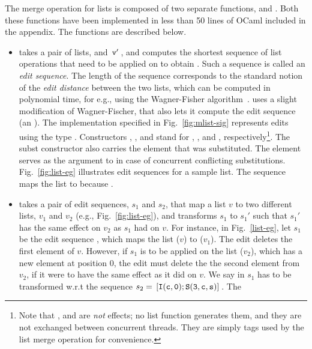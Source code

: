 The merge operation for lists is composed of two separate functions,
 and . Both these functions have been
implemented in less than 50 lines of OCaml included in the appendix.
The functions are described below.
\begin{itemize}
  \item {} takes a pair of lists,  and $\,{\tt v'}\,$, and
  computes the shortest sequence of list operations that need to be
  applied on  to obtain . Such a sequence is called an
  \emph{edit sequence}. The length of the sequence corresponds to the
  standard notion of the \emph{edit distance} between the two lists,
  which can be computed in polynomial time, for e.g., using the
  Wagner-Fisher algorithm~\cite{wagner-fischer}.  uses a
  slight modification of Wagner-Fischer, that also lets it compute the
  edit sequence (an ). The implementation specified in
  Fig.~\ref{fig:mlist-sig} represents edits using the type .
  Constructors , , and  stand for ,
  , and , respectively\footnote{
    Note that ,  and  are \emph{not} effects; no list
    function generates them, and they are not exchanged between
    concurrent threads. They are simply tags used by the list merge
    operation for convenience.
  }. The subst constructor also carries the  element that was
  substituted. The element serves as the  argument to
   in case of concurrent conflicting substitutions.
  Fig.~\ref{fig:list-eg} illustrates edit sequences for a sample list.
  The sequence \C{[I(c,0); S(3,c,s)]} maps the list \C{[a;b;c]} to
  \C{[c;a;b;s]} because .
  \item  {} takes a pair of edit sequences, $s_1$ and
  $s_2$, that map a list $v$ to two different lists, $v_1$ and $v_2$
  (e.g., Fig.~\ref{fig:list-eg}), and transforms $s_1$ to $s_1'$ such
  that $s_1'$ has the same effect on $v_2$ as $s_1$ had on $v$.  For
  instance, in Fig.~\ref{list-eg}, let $s_1$ be the edit sequence
  \C{[D(1); S(1,c,d)]}, which maps the list \C{[a;b;c]} ($v$) to
  \C{[a;d]} ($v_1$). The  edit deletes the first element of $v$.
  However, if $s_1$ is to be applied on the list \C{[c;a;b;s]}
  ($v_2$), which has a new element at position 0, the  edit must
  delete the the second element from $v_2$, if it were to have the
  same effect as it did on $v$. We say  in $s_1$ has to be
  transformed w.r.t the sequence $s_2 = \,{\tt [I(c,0);S(3,c,s)]}\,$.  The

\end{itemize}
